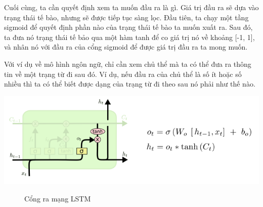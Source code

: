 Cuối cùng, ta cần quyết định xem ta muốn đầu ra là gì. Giá trị đầu ra sẽ dựa vào trạng thái tế bào, nhưng sẽ được tiếp tục sàng lọc. Đầu tiên, ta chạy một tầng sigmoid để quyết định phần nào của trạng thái tế bào ta muốn xuất ra. Sau đó, ta đưa nó trạng thái tế bảo qua một hàm tanh để co giá trị nó về khoảng [-1, 1], và nhân nó với đầu ra của cổng sigmoid để được giá trị đầu ra ta mong muốn.\par
Với ví dụ về mô hình ngôn ngữ, chỉ cần xem chủ thể mà ta có thể đưa ra thông tin về một trạng từ đi sau đó. Ví dụ, nếu đầu ra của chủ thể là số ít hoặc số nhiều thì ta có thể biết được dạng của trạng từ đi theo sau nó phải như thế nào.
\begin{center}
    \includegraphics[scale=.5]{image/chapter6/bt4.png}
    \begin{figure}[htp]
    \begin{center}
     
    \end{center}
    \caption{Cổng ra mạng LSTM}
    \end{figure}
\end{center}


